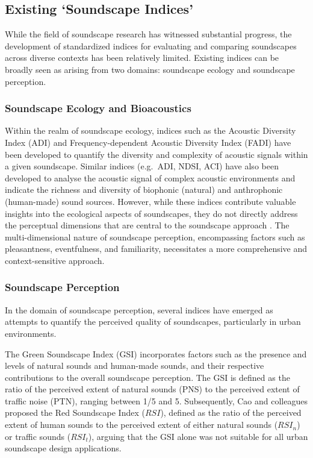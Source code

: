 \documentclass[
  authoryear,
  3p]{elsarticle}
\begin{document}
\subsection{Existing `Soundscape
Indices'}\label{sec-existing-soundscape-indices}

While the field of soundscape research has witnessed substantial
progress, the development of standardized indices for evaluating and
comparing soundscapes across diverse contexts has been relatively
limited. Existing indices can be broadly seen as arising from two
domains: soundscape ecology and soundscape perception.

\subsubsection{Soundscape Ecology and
Bioacoustics}\label{sec-soundscape-ecology-and-bioacoustics}

Within the realm of soundscape ecology, indices such as the Acoustic
Diversity Index (ADI) and Frequency-dependent Acoustic Diversity Index
(FADI) \citep{Xu2023frequency} have been developed to quantify the
diversity and complexity of acoustic signals within a given soundscape.
Similar indices (e.g.~ADI, NDSI, ACI) have also been developed to
analyse the acoustic signal of complex acoustic environments and
indicate the richness and diversity of biophonic (natural) and
anthrophonic (human-made) sound sources. However, while these indices
contribute valuable insights into the ecological aspects of soundscapes,
they do not directly address the perceptual dimensions that are central
to the soundscape approach \citep{SchulteFortkamp2023Soundscapes}. The
multi-dimensional nature of soundscape perception, encompassing factors
such as pleasantness, eventfulness, and familiarity, necessitates a more
comprehensive and context-sensitive approach.

\subsubsection{Soundscape Perception}\label{sec-soundscape-perception}

In the domain of soundscape perception, several indices have emerged as
attempts to quantify the perceived quality of soundscapes, particularly
in urban environments.

The Green Soundscape Index (GSI) \citep{Kogan2018Green} incorporates
factors such as the presence and levels of natural sounds and human-made
sounds, and their respective contributions to the overall soundscape
perception. The GSI is defined as the ratio of the perceived extent of
natural sounds (PNS) to the perceived extent of traffic noise (PTN),
ranging between 1/5 and 5. Subsequently, Cao and colleagues
\citep{Cao2020Red, Yang2022Effects} proposed the Red Soundscape Index
(\(RSI\)), defined as the ratio of the perceived extent of human sounds
to the perceived extent of either natural sounds (\(RSI_n\)) or traffic
sounds (\(RSI_t\)), arguing that the GSI alone was not suitable for all
urban soundscape design applications.
\end{document}
